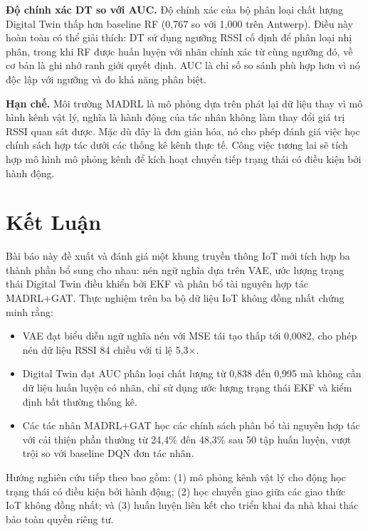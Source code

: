 \documentclass[conference]{IEEEtran}
\begin{document}
\textbf{Độ chính xác DT so với AUC.}
Độ chính xác của bộ phân loại chất lượng Digital Twin thấp hơn
baseline RF (0,767 so với 1,000 trên Antwerp). Điều này hoàn
toàn có thể giải thích: DT sử dụng ngưỡng RSSI cố định để phân
loại nhị phân, trong khi RF được huấn luyện với nhãn chính xác
từ cùng ngưỡng đó, về cơ bản là ghi nhớ ranh giới quyết định.
AUC là chỉ số so sánh phù hợp hơn vì nó độc lập với ngưỡng
và đo khả năng phân biệt.

\textbf{Hạn chế.} Môi trường MADRL là mô phỏng dựa trên phát
lại dữ liệu thay vì mô hình kênh vật lý, nghĩa là hành động của
tác nhân không làm thay đổi giá trị RSSI quan sát được. Mặc dù
đây là đơn giản hóa, nó cho phép đánh giá việc học chính sách
hợp tác dưới các thống kê kênh thực tế. Công việc tương lai sẽ
tích hợp mô hình mô phỏng kênh để kích hoạt chuyển tiếp trạng
thái có điều kiện bởi hành động.

\section{Kết Luận}
\label{sec:conclusion}

Bài báo này đề xuất và đánh giá một khung truyền thông IoT mới
tích hợp ba thành phần bổ sung cho nhau: nén ngữ nghĩa dựa trên
VAE, ước lượng trạng thái Digital Twin điều khiển bởi EKF và
phân bổ tài nguyên hợp tác MADRL+GAT. Thực nghiệm trên ba bộ
dữ liệu IoT không đồng nhất chứng minh rằng:
\begin{itemize}
  \item VAE đạt biểu diễn ngữ nghĩa nén với MSE tái tạo thấp
        tới 0,0082, cho phép nén dữ liệu RSSI 84 chiều với tỉ lệ
        5,3$\times$.
  \item Digital Twin đạt AUC phân loại chất lượng từ 0,838 đến
        0,995 mà không cần dữ liệu huấn luyện có nhãn, chỉ sử
        dụng ước lượng trạng thái EKF và kiểm định bất thường thống kê.
  \item Các tác nhân MADRL+GAT học các chính sách phân bổ tài
        nguyên hợp tác với cải thiện phần thưởng từ 24,4\% đến
        48,3\% sau 50 tập huấn luyện, vượt trội so với baseline DQN đơn tác nhân.
\end{itemize}

Hướng nghiên cứu tiếp theo bao gồm: (1) mô phỏng kênh vật lý
cho động học trạng thái có điều kiện bởi hành động; (2) học
chuyển giao giữa các giao thức IoT không đồng nhất; và (3) huấn
luyện liên kết cho triển khai đa nhà khai thác bảo toàn quyền riêng tư.
\end{document}
